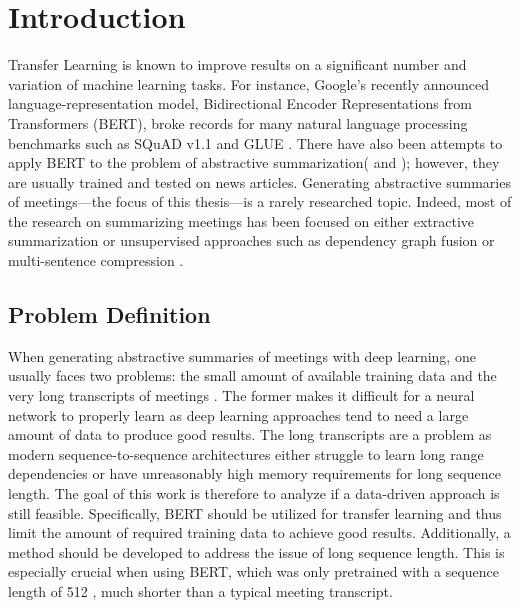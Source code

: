 \chapter{Introduction}\label{ch:Introduction}


Transfer Learning is known to improve results on a significant number and variation of machine learning tasks.
For instance, Google's recently announced language-representation model, Bidirectional Encoder Representations from Transformers (BERT), broke records for many natural language processing benchmarks \cite[p.~5--7]{devlin2018bert} such as  SQuAD v1.1 \cite{rajpurkar-etal-2016-squad} and GLUE \cite{1804.07461}.
There have also been attempts to apply BERT to the problem of abstractive summarization(\cite{1902.09243} and \cite{1908.08345}); however, they are usually trained and tested on news articles.
Generating abstractive summaries of meetings---the focus of this thesis---is a rarely researched topic. %
Indeed, most of the research on summarizing meetings has been focused on either extractive summarization or unsupervised approaches such as dependency graph fusion \cite{1609.07035} or multi-sentence compression \cite{shang-etal-2018-unsupervised}.


\section{Problem Definition}

When generating abstractive summaries of meetings with deep learning, one usually faces two problems: the small amount of available training data and the very long transcripts of meetings \cite[p.~650--651]{10.1007/978-3-030-20521-8_53}.
The former makes it difficult for a neural network to properly learn as deep learning approaches tend to need a large amount of data to produce good results.
The long transcripts are a problem as modern sequence-to-sequence architectures either struggle to learn long range dependencies \cite{Hochreiter01gradientflow} or have unreasonably high memory requirements for long sequence length.
The goal of this work is therefore to analyze if a data-driven approach is still feasible. %
Specifically, BERT should be utilized for transfer learning and thus limit the amount of required training data to achieve good results.
Additionally, a method should be developed to address the issue of long sequence length.
This is especially crucial when using BERT, which was only pretrained with a sequence length of 512 \cite[p.~13]{devlin2018bert}, much shorter than a typical meeting transcript.

